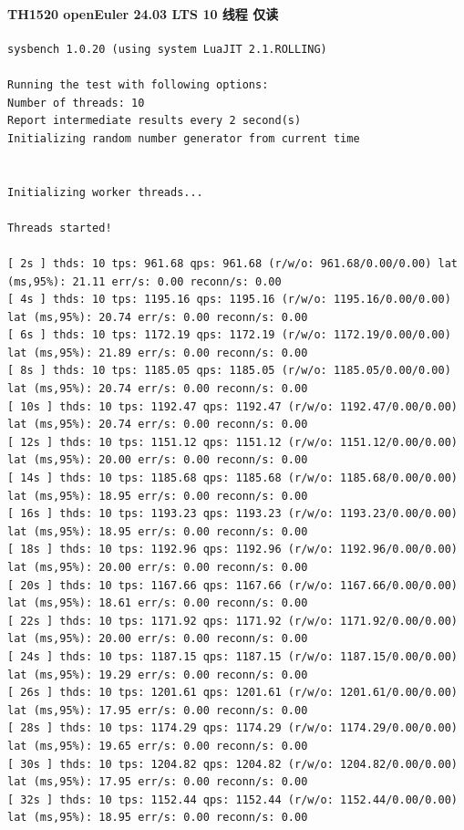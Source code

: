 \documentclass{article}
\begin{document}
\paragraph{TH1520 openEuler 24.03 LTS 10 线程 仅读}

\begin{verbatim}
sysbench 1.0.20 (using system LuaJIT 2.1.ROLLING)

Running the test with following options:
Number of threads: 10
Report intermediate results every 2 second(s)
Initializing random number generator from current time


Initializing worker threads...

Threads started!

[ 2s ] thds: 10 tps: 961.68 qps: 961.68 (r/w/o: 961.68/0.00/0.00) lat (ms,95%): 21.11 err/s: 0.00 reconn/s: 0.00
[ 4s ] thds: 10 tps: 1195.16 qps: 1195.16 (r/w/o: 1195.16/0.00/0.00) lat (ms,95%): 20.74 err/s: 0.00 reconn/s: 0.00
[ 6s ] thds: 10 tps: 1172.19 qps: 1172.19 (r/w/o: 1172.19/0.00/0.00) lat (ms,95%): 21.89 err/s: 0.00 reconn/s: 0.00
[ 8s ] thds: 10 tps: 1185.05 qps: 1185.05 (r/w/o: 1185.05/0.00/0.00) lat (ms,95%): 20.74 err/s: 0.00 reconn/s: 0.00
[ 10s ] thds: 10 tps: 1192.47 qps: 1192.47 (r/w/o: 1192.47/0.00/0.00) lat (ms,95%): 20.74 err/s: 0.00 reconn/s: 0.00
[ 12s ] thds: 10 tps: 1151.12 qps: 1151.12 (r/w/o: 1151.12/0.00/0.00) lat (ms,95%): 20.00 err/s: 0.00 reconn/s: 0.00
[ 14s ] thds: 10 tps: 1185.68 qps: 1185.68 (r/w/o: 1185.68/0.00/0.00) lat (ms,95%): 18.95 err/s: 0.00 reconn/s: 0.00
[ 16s ] thds: 10 tps: 1193.23 qps: 1193.23 (r/w/o: 1193.23/0.00/0.00) lat (ms,95%): 18.95 err/s: 0.00 reconn/s: 0.00
[ 18s ] thds: 10 tps: 1192.96 qps: 1192.96 (r/w/o: 1192.96/0.00/0.00) lat (ms,95%): 20.00 err/s: 0.00 reconn/s: 0.00
[ 20s ] thds: 10 tps: 1167.66 qps: 1167.66 (r/w/o: 1167.66/0.00/0.00) lat (ms,95%): 18.61 err/s: 0.00 reconn/s: 0.00
[ 22s ] thds: 10 tps: 1171.92 qps: 1171.92 (r/w/o: 1171.92/0.00/0.00) lat (ms,95%): 20.00 err/s: 0.00 reconn/s: 0.00
[ 24s ] thds: 10 tps: 1187.15 qps: 1187.15 (r/w/o: 1187.15/0.00/0.00) lat (ms,95%): 19.29 err/s: 0.00 reconn/s: 0.00
[ 26s ] thds: 10 tps: 1201.61 qps: 1201.61 (r/w/o: 1201.61/0.00/0.00) lat (ms,95%): 17.95 err/s: 0.00 reconn/s: 0.00
[ 28s ] thds: 10 tps: 1174.29 qps: 1174.29 (r/w/o: 1174.29/0.00/0.00) lat (ms,95%): 19.65 err/s: 0.00 reconn/s: 0.00
[ 30s ] thds: 10 tps: 1204.82 qps: 1204.82 (r/w/o: 1204.82/0.00/0.00) lat (ms,95%): 17.95 err/s: 0.00 reconn/s: 0.00
[ 32s ] thds: 10 tps: 1152.44 qps: 1152.44 (r/w/o: 1152.44/0.00/0.00) lat (ms,95%): 18.95 err/s: 0.00 reconn/s: 0.00

\end{verbatim}
\end{document}
